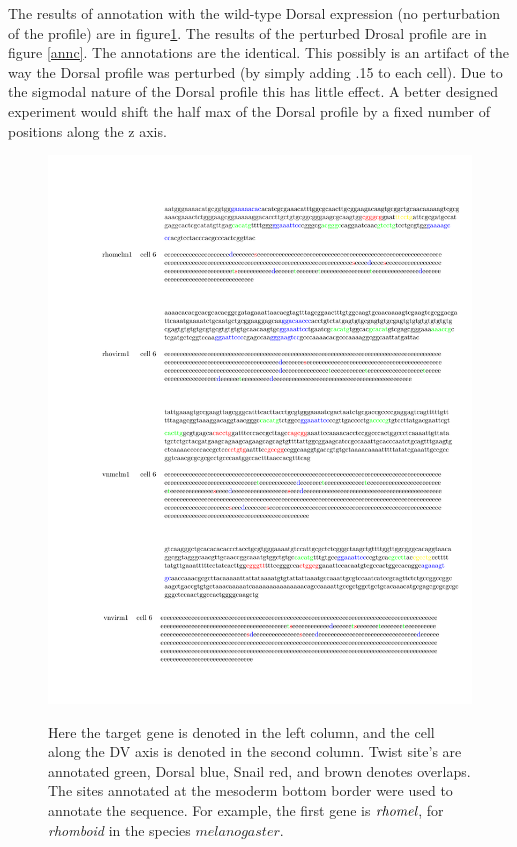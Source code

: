 The results of annotation with the wild-type Dorsal expression (no perturbation of the profile) are in figure\ref{annb}.  The results of the perturbed Drosal profile are in figure \ref{annc}.  The annotations are the identical.  This possibly is an artifact of the way the Dorsal profile was perturbed (by simply adding .15 to each cell).  Due to the sigmodal nature of the Dorsal profile this has little effect.  A better designed experiment would shift the half max of the Dorsal profile by a fixed number of positions along the z axis.


%
\begin{figure}
  \includegraphics[height=1\textwidth]{annb}\\
  \caption{Here the target gene is denoted in the left column, and the cell along the DV axis is denoted in the second column.  Twist site's are annotated green, Dorsal blue, Snail red, and brown denotes overlaps.  The sites annotated at the mesoderm bottom border were used to annotate the sequence.  For example, the first gene is $\emph{rhomel}$, for \textit{rhomboid} in the species $melanogaster$. }\label{annb}
\end{figure}

